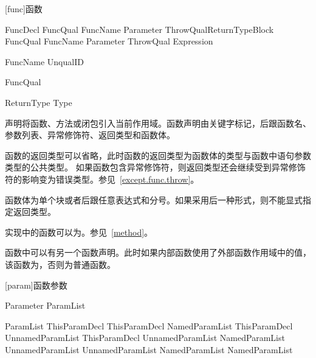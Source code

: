 
[func]{函数}

\begin{bnf}{FuncDecl}
    FuncQual\bnfs {} FuncName Parameter ThrowQual\bnfq ReturnType\bnfq Block \br
    FuncQual\bnfs {} FuncName Parameter ThrowQual\bnfq \terminal{=>} Expression \terminal{;}
\end{bnf}

\begin{bnf}{FuncName}
    UnqualID
\end{bnf}

\begin{bnf}{FuncQual}
     \br
     \br
     \br
\end{bnf}

\begin{bnf}{ReturnType}
    \terminal{->} Type
\end{bnf}

\pnum
{}声明将函数、方法或闭包引入当前作用域。函数声明由关键字标记，后跟函数名、参数列表、异常修饰符、返回类型和函数体。

\pnum
函数的返回类型可以省略，此时函数的返回类型为函数体的类型与函数中语句参数类型的公共类型。
如果函数包含异常修饰符，则返回类型还会继续受到异常修饰符的影响变为错误类型。参见~\ref{except.func.throw}。

\pnum
函数体为单个块或者\tcode{=>}后跟任意表达式和分号。如果采用后一种形式，则不能显式指定返回类型。

\pnum
实现中的函数可以为。参见~\ref{method}。

\pnum
函数中可以有另一个函数声明。此时如果内部函数使用了外部函数作用域中的值，该函数为，否则为普通函数。

[param]{函数参数}

\begin{bnf}{Parameter}
    \terminal{(} ParamList\bnfq \terminal{)}
\end{bnf}

\begin{bnf}{ParamList}
    ThisParamDecl \br
    ThisParamDecl \terminal{,} NamedParamList \br
    ThisParamDecl \terminal{,} UnnamedParamList \br
    ThisParamDecl \terminal{,} UnnamedParamList \terminal{,} NamedParamList \br
    UnnamedParamList \br
    UnnamedParamList \terminal{,} NamedParamList \br
    NamedParamList
\end{bnf}

